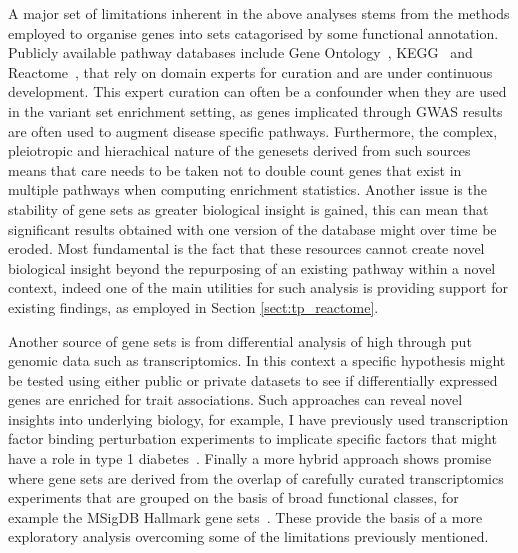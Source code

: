 \documentclass[a4paper,11pt]{report}
\begin{document}
A major set of limitations inherent in the above analyses stems from the methods employed to organise genes into sets catagorised by some functional annotation. Publicly available pathway databases include Gene Ontology~\citep{AshburnerBallBlakeEtAl2000}, KEGG~\citep{KanehisaGoto2000} and Reactome~\citep{MilacicHawRothfelsEtAl2012}, that rely on domain experts for curation and are under continuous development. This expert curation can often be a confounder when they are used in the variant set enrichment setting, as genes implicated through GWAS results are often used to augment disease specific pathways.  Furthermore, the complex, pleiotropic and hierachical nature of the genesets derived from such sources means that care needs to be taken not to double count genes that exist in multiple pathways when computing enrichment statistics. Another issue is the stability of gene sets as greater biological insight is gained, this can mean that significant results obtained with one version of the database might over time be eroded. Most fundamental is the fact that these resources cannot create novel biological insight beyond  the repurposing of an existing pathway within a novel context, indeed one of the main utilities for such analysis is providing support for existing findings, as employed in Section \ref{sect:tp_reactome}.

Another source of gene sets is from differential analysis of high through put genomic data such as transcriptomics. In this context a specific hypothesis might be tested using either public or private datasets to see if differentially expressed genes are enriched for trait associations. Such approaches can reveal novel insights into underlying biology, for example, I have previously used transcription factor binding perturbation experiments to implicate specific factors that might have a role in type 1 diabetes~\citep{Burren2014-vh}. Finally a more hybrid approach shows promise where gene sets are derived from the overlap of carefully curated transcriptomics experiments that are grouped on the basis of broad functional classes, for example  the MSigDB Hallmark gene sets~\citep{Subramanian2005-ke}. These provide the basis of a more exploratory analysis overcoming some of the limitations previously mentioned.  



\end{document}
